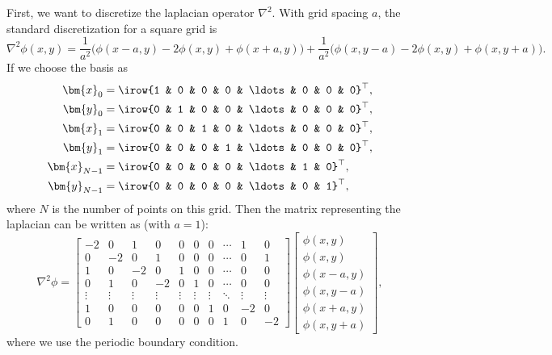 \Answer{}
First, we want to discretize the laplacian operator \(\nabla^2\).
With grid spacing \(a\), the standard discretization for a square grid is
%
\begin{equation}
    \nabla^2 \phi(x, y) =
    \frac{ 1 }{ a^2 } \bigl(\phi(x - a, y) - 2 \phi(x, y) + \phi(x + a, y)\bigr) +
    \frac{ 1 }{ a^2 } \bigl(\phi(x, y - a) - 2 \phi(x, y) + \phi(x, y + a)\bigr).
\end{equation}
%
If we choose the basis as
%
\begin{equation}
    \begin{split}
        \bm{x}_{0} &= \irow{1 & 0 & 0 & 0 & \ldots & 0 & 0 & 0}^\top, \\
        \bm{y}_{0} &= \irow{0 & 1 & 0 & 0 & \ldots & 0 & 0 & 0}^\top, \\
        \bm{x}_{1} &= \irow{0 & 0 & 1 & 0 & \ldots & 0 & 0 & 0}^\top, \\
        \bm{y}_{1} &= \irow{0 & 0 & 0 & 1 & \ldots & 0 & 0 & 0}^\top, \\
        \bm{x}_{N - 1} &= \irow{0 & 0 & 0 & 0 & \ldots & 1 & 0}^\top, \\
        \bm{y}_{N - 1} &= \irow{0 & 0 & 0 & 0 & \ldots & 0 & 1}^\top,
    \end{split}
\end{equation}
%
where \(N\) is the number of points on this grid.
Then the matrix representing the laplacian can be written as (with \(a = 1\)):
%
\begin{equation}
    \nabla^2 \phi = \begin{bmatrix}
        -2     & 0      & 1      & 0      & 0      & 0      & 0      & \cdots & 1      & 0      \\
        0      & -2     & 0      & 1      & 0      & 0      & 0      & \cdots & 0      & 1      \\
        1      & 0      & -2     & 0      & 1      & 0      & 0      & \cdots & 0      & 0      \\
        0      & 1      & 0      & -2     & 0      & 1      & 0      & \cdots & 0      & 0      \\
        \vdots & \vdots & \vdots & \vdots & \vdots & \vdots & \vdots & \ddots & \vdots & \vdots \\
        1      & 0      & 0      & 0      & 0      & 0      & 1      & 0      & -2     & 0      \\
        0      & 1      & 0      & 0      & 0      & 0      & 0      & 1      & 0      & -2
    \end{bmatrix}
    \begin{bmatrix}
        \phi(x, y)     \\
        \phi(x, y)     \\
        \phi(x - a, y) \\
        \phi(x, y - a) \\
        \phi(x + a, y) \\
        \phi(x, y + a)
    \end{bmatrix},
\end{equation}
%
where we use the periodic boundary condition.

